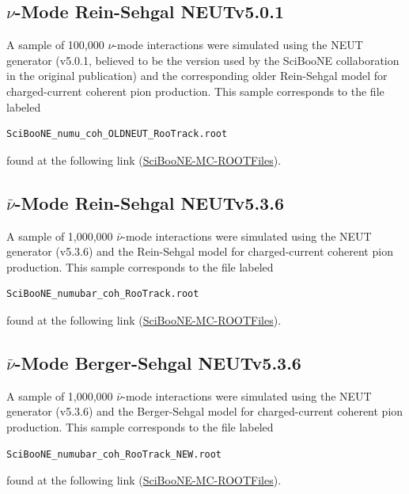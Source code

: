 \documentclass[11pt]{article}
\begin{document}
\subsection{$\nu$-Mode Rein-Sehgal NEUTv5.0.1}
\label{sub:NMRSv5.0.1}
A sample of 100,000 $\nu$-mode interactions were simulated using the NEUT generator (v5.0.1, believed to be the version used by the SciBooNE collaboration in the original publication) and the corresponding older Rein-Sehgal model for charged-current coherent pion production. This sample corresponds to the file labeled
\begin{verbatim}
SciBooNE_numu_coh_OLDNEUT_RooTrack.root
\end{verbatim}
found at the following link (\href{https://drive.google.com/open?id=0B4rvJl9swUOxcEtpSl94RDRsc3c}{SciBooNE-MC-ROOTFiles}).


\subsection{$\bar{\nu}$-Mode Rein-Sehgal NEUTv5.3.6}
\label{sub:ANMRSv5.3.6}
A sample of 1,000,000 $\bar{\nu}$-mode interactions were simulated using the NEUT generator (v5.3.6) and the Rein-Sehgal model for charged-current coherent pion production. This sample corresponds to the file labeled
\begin{verbatim}
SciBooNE_numubar_coh_RooTrack.root
\end{verbatim}
found at the following link (\href{https://drive.google.com/open?id=0B4rvJl9swUOxcEtpSl94RDRsc3c}{SciBooNE-MC-ROOTFiles}).

\subsection{$\bar{\nu}$-Mode Berger-Sehgal NEUTv5.3.6}
\label{sub:ANMBSv5.3.6}
A sample of 1,000,000 $\bar{\nu}$-mode interactions were simulated using the NEUT generator (v5.3.6) and the Berger-Sehgal model for charged-current coherent pion production. This sample corresponds to the file labeled
\begin{verbatim}
SciBooNE_numubar_coh_RooTrack_NEW.root
\end{verbatim}
found at the following link (\href{https://drive.google.com/open?id=0B4rvJl9swUOxcEtpSl94RDRsc3c}{SciBooNE-MC-ROOTFiles}).
\end{document}
